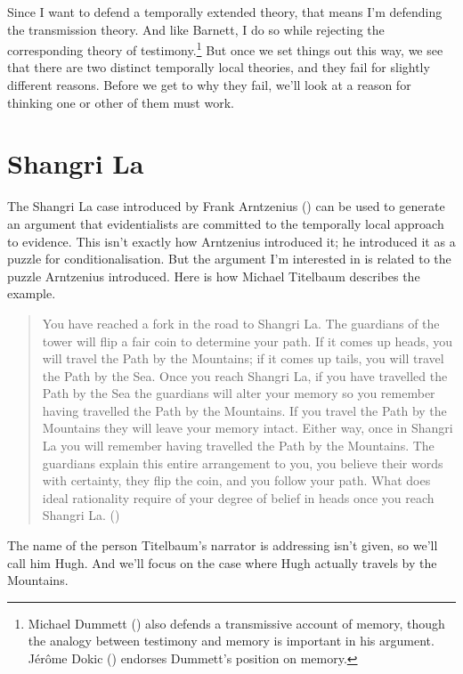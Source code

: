 \documentclass[
  10pt,
  letterpaper,
  DIV=11,
  numbers=noendperiod,
  twoside]{scrartcl}
\begin{document}
Since I want to defend a temporally extended theory, that means I'm
defending the transmission theory. And like Barnett, I do so while
rejecting the corresponding theory of testimony.\footnote{Michael
  Dummett () also defends a transmissive
  account of memory, though the analogy between testimony and memory is
  important in his argument. Jérôme Dokic
  () endorses Dummett's position on
  memory.} But once we set things out this way, we see that there are
two distinct temporally local theories, and they fail for slightly
different reasons. Before we get to why they fail, we'll look at a
reason for thinking one or other of them must work.

\section{Shangri La}\label{shangrila}

The Shangri La case introduced by Frank Arntzenius
() can be used to generate an
argument that evidentialists are committed to the temporally local
approach to evidence. This isn't exactly how Arntzenius introduced it;
he introduced it as a puzzle for conditionalisation. But the argument
I'm interested in is related to the puzzle Arntzenius introduced. Here
is how Michael Titelbaum describes the example.

\begin{quote}
You have reached a fork in the road to Shangri La. The guardians of the
tower will flip a fair coin to determine your path. If it comes up
heads, you will travel the Path by the Mountains; if it comes up tails,
you will travel the Path by the Sea. Once you reach Shangri La, if you
have travelled the Path by the Sea the guardians will alter your memory
so you remember having travelled the Path by the Mountains. If you
travel the Path by the Mountains they will leave your memory intact.
Either way, once in Shangri La you will remember having travelled the
Path by the Mountains. The guardians explain this entire arrangement to
you, you believe their words with certainty, they flip the coin, and you
follow your path. What does ideal rationality require of your degree of
belief in heads once you reach Shangri La.
()
\end{quote}

The name of the person Titelbaum's narrator is addressing isn't given,
so we'll call him Hugh. And we'll focus on the case where Hugh actually
travels by the Mountains.
\end{document}
